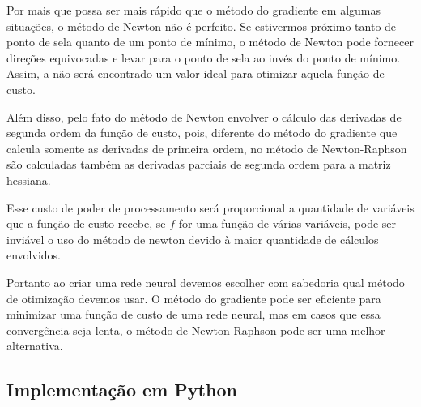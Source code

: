 Por mais que possa ser mais rápido que o método do gradiente em algumas situações, o método de Newton não é perfeito. Se estivermos próximo tanto de ponto de sela quanto de um ponto de mínimo, o método de Newton pode fornecer direções equivocadas e levar para o ponto de sela ao invés do ponto de mínimo. Assim, a não será encontrado um valor ideal para otimizar aquela função de custo.

Além disso, pelo fato do método de Newton envolver o cálculo das derivadas de segunda ordem da função de custo, pois, diferente do método do gradiente que calcula somente as derivadas de primeira ordem, no método de Newton-Raphson são calculadas também as derivadas parciais de segunda ordem para a matriz hessiana.

 Esse custo de poder de processamento será proporcional a quantidade de variáveis que a função de custo recebe, se $f$ for uma função de várias variáveis, pode ser inviável o uso do método de newton devido à maior quantidade de cálculos envolvidos.

Portanto ao criar uma rede neural devemos escolher com sabedoria qual método de otimização devemos usar. O método do gradiente pode ser eficiente para minimizar uma função de custo de uma rede neural, mas em casos que essa convergência seja lenta, o método de Newton-Raphson pode ser uma melhor alternativa.

\subsection{Implementação em Python}

